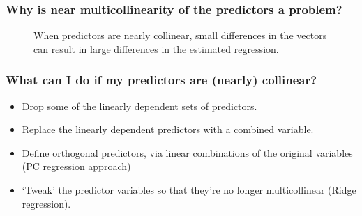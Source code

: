 \documentclass{beamer}
\begin{document}
\begin{frame}
  \frametitle{Why is near multicollinearity of the predictors a problem?}

\begin{figure}
\begin{center}
\end{center}
\caption{When predictors are nearly collinear, small differences in the vectors can result in large differences in the estimated regression.}
\end{figure}


\end{frame}


\begin{frame}
  \frametitle{What can I do if my predictors are (nearly) collinear?}

\begin{itemize}
	\item Drop some of the linearly dependent sets of predictors.
	\item Replace the linearly dependent predictors with a combined variable.
	\item Define orthogonal predictors, via linear combinations of the original variables (PC regression approach)
	\item `Tweak' the predictor variables so that they're no longer multicollinear (Ridge regression).
\end{itemize}


\end{frame}
\end{document}
